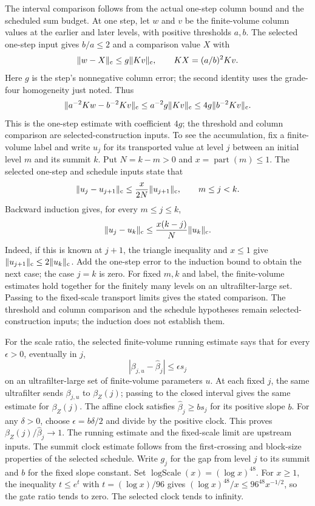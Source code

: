 The interval comparison follows from the actual one-step column bound and
the scheduled sum budget. At one step, let $w$ and $v$ be the finite-volume
column values at the earlier and later levels, with positive thresholds
$a,b$. The selected one-step input gives $b/a\le2$ and a comparison value
$X$ with
\[
 \|w-X\|_{\rm c}\le g\|Kv\|_{\rm c},\qquad
 KX=(a/b)^2Kv.
\]
Here $g$ is the step's nonnegative column error; the second identity uses
the grade-four homogeneity just noted. Thus
\[
 \|a^{-2}Kw-b^{-2}Kv\|_{\rm c}
 \le a^{-2}g\|Kv\|_{\rm c}
 \le 4g\|b^{-2}Kv\|_{\rm c}.
\]
This is the one-step estimate with coefficient $4g$; the threshold and
column comparison are selected-construction inputs. To see the
accumulation, fix a finite-volume label and write $u_j$ for its transported
value at level $j$ between an initial level $m$ and its summit $k$. Put $N=k-m>0$ and
$x=\operatorname{part}(m)\le1$. The selected one-step and schedule inputs
state that
\[
 \|u_j-u_{j+1}\|_{\rm c}
 \le \frac{x}{2N}\|u_{j+1}\|_{\rm c},\qquad m\le j<k.
\]
Backward induction gives, for every $m\le j\le k$,
\[
 \|u_j-u_k\|_{\rm c}
 \le \frac{x(k-j)}N\|u_k\|_{\rm c}.
\]
Indeed, if this is known at $j+1$, the triangle inequality and $x\le1$
give $\|u_{j+1}\|_{\rm c}\le2\|u_k\|_{\rm c}$. Add the one-step error
to the induction bound to obtain the next case; the case $j=k$ is zero.
For fixed $m,k$ and label, the finite-volume estimates hold together for
the finitely many levels on an ultrafilter-large set. Passing to the
fixed-scale transport limits gives the stated comparison. The threshold and column comparison and the schedule hypotheses remain
selected-construction inputs; the induction does not establish them.

For the scale ratio, the selected finite-volume running estimate says
that for every $\epsilon>0$, eventually in $j$,
\[
 |\beta_{j,u}-\widehat\beta_j|\le\epsilon s_j
\]
on an ultrafilter-large set of finite-volume parameters $u$. At each fixed
$j$, the same ultrafilter sends $\beta_{j,u}$ to $\beta_Z(j)$; passing to
the closed interval gives the same estimate for $\beta_Z(j)$. The affine
clock satisfies $\widehat\beta_j\ge b s_j$ for its positive slope $b$.
For any $\delta>0$, choose $\epsilon=b\delta/2$ and divide by the positive
clock. This proves $\beta_Z(j)/\widehat\beta_j\to1$. The running estimate
and the fixed-scale limit are upstream inputs. The summit clock estimate follows from the first-crossing and
block-size properties of the selected schedule. Write $g_j$ for the gap
from level $j$ to its summit and $b$ for the fixed slope constant. Set
$\operatorname{logScale}(x)=(\log x)^{48}$. For $x\ge1$, the inequality
$t\le e^t$ with $t=(\log x)/96$ gives
$(\log x)^{48}/x\le96^{48}x^{-1/2}$, so the gate ratio tends to zero.
The selected clock tends to infinity.

